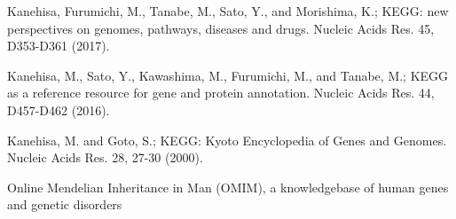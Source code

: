  Kanehisa, Furumichi, M., Tanabe, M., Sato, Y., and Morishima, K.; 
\newblock KEGG: new perspectives on genomes, pathways, diseases and drugs. 
\newblock Nucleic Acids Res. 45, D353-D361 (2017).

 Kanehisa, M., Sato, Y., Kawashima, M., Furumichi, M., and Tanabe, M.; 
\newblock KEGG as a reference resource for gene and protein annotation. 
\newblock Nucleic Acids Res. 44, D457-D462 (2016).

 Kanehisa, M. and Goto, S.; 
\newblock KEGG: Kyoto Encyclopedia of Genes and Genomes. 
\newblock Nucleic Acids Res. 28, 27-30 (2000). 

 Online Mendelian Inheritance in Man (OMIM), a knowledgebase of human genes and genetic disorders
